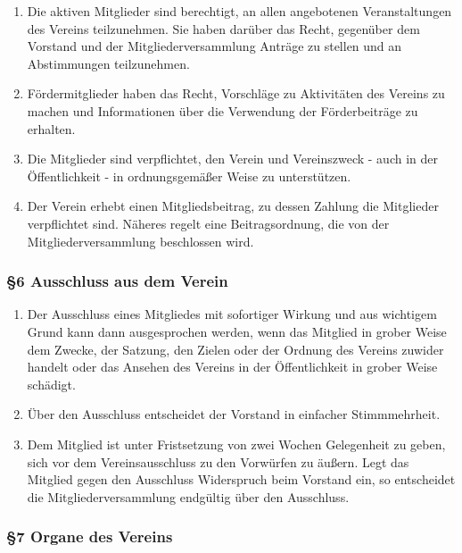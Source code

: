 \documentclass[german]{article}
\begin{document}
\begin{enumerate}
\def\labelenumi{\arabic{enumi}.}
\item
  Die aktiven Mitglieder sind berechtigt, an allen angebotenen
  Veranstaltungen des Vereins teilzunehmen. Sie haben darüber das Recht,
  gegenüber dem Vorstand und der Mitgliederversammlung Anträge zu
  stellen und an Abstimmungen teilzunehmen.
\item
  Fördermitglieder haben das Recht, Vorschläge zu Aktivitäten des
  Vereins zu machen und Informationen über die Verwendung der
  Förderbeiträge zu erhalten.
\item
  Die Mitglieder sind verpflichtet, den Verein und Vereinszweck - auch
  in der Öffentlichkeit - in ordnungsgemäßer Weise zu unterstützen.
\item
  Der Verein erhebt einen Mitgliedsbeitrag, zu dessen Zahlung die
  Mitglieder verpflichtet sind. Näheres regelt eine Beitragsordnung, die
  von der Mitgliederversammlung beschlossen wird.
\end{enumerate}

\subsubsection*{§6 Ausschluss aus dem
Verein}\label{ausschluss-aus-dem-verein}

\begin{enumerate}
\def\labelenumi{\arabic{enumi}.}
\item
  Der Ausschluss eines Mitgliedes mit sofortiger Wirkung und aus
  wichtigem Grund kann dann ausgesprochen werden, wenn das Mitglied in
  grober Weise dem Zwecke, der Satzung, den Zielen oder der Ordnung des
  Vereins zuwider handelt oder das Ansehen des Vereins in der
  Öffentlichkeit in grober Weise schädigt.
\item
  Über den Ausschluss entscheidet der Vorstand in einfacher
  Stimmmehrheit.
\item
  Dem Mitglied ist unter Fristsetzung von zwei Wochen Gelegenheit zu
  geben, sich vor dem Vereinsausschluss zu den Vorwürfen zu äußern. Legt
  das Mitglied gegen den Ausschluss Widerspruch beim Vorstand ein, so
  entscheidet die Mitgliederversammlung endgültig über den Ausschluss.
\end{enumerate}

\subsubsection*{§7 Organe des Vereins}\label{organe-des-vereins}
\end{document}
